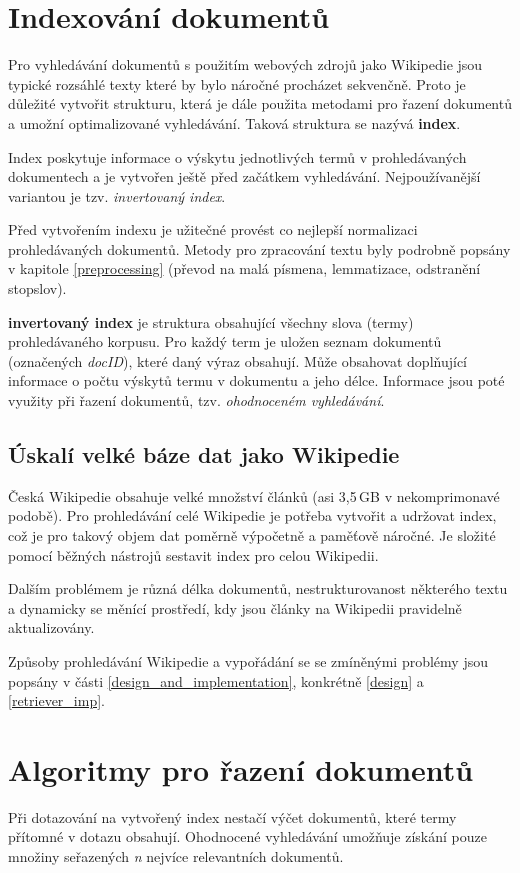 \section{Indexování dokumentů}
Pro vyhledávání dokumentů s použitím webových zdrojů jako Wikipedie jsou typické rozsáhlé texty které by bylo náročné procházet sekvenčně. Proto je důležité vytvořit strukturu, která je dále použita metodami pro řazení dokumentů a umožní optimalizované vyhledávání. Taková struktura se nazývá \textbf{index}.\par
Index poskytuje informace o výskytu jednotlivých termů v prohledávaných dokumentech a je vytvořen ještě před začátkem vyhledávání. Nejpoužívanější variantou je tzv. \emph{invertovaný index}.\par
Před vytvořením indexu je užitečné provést co nejlepší normalizaci prohledávaných dokumentů. Metody pro zpracování textu byly podrobně popsány v kapitole \ref{preprocessing} (převod na malá písmena, lemmatizace, odstranění stopslov).\par
\textbf{invertovaný index} je struktura obsahující všechny slova (termy) prohledávaného korpusu. Pro každý term je uložen seznam dokumentů (označených \emph{docID}), které daný výraz obsahují. Může obsahovat doplňující informace o počtu výskytů termu v dokumentu a jeho délce. Informace jsou poté využity při řazení dokumentů, tzv. \emph{ohodnoceném vyhledávání}.

\subsection{Úskalí velké báze dat jako Wikipedie}
Česká Wikipedie obsahuje velké množství článků (asi 3,5\,GB v nekomprimonavé podobě). Pro prohledávání celé Wikipedie je potřeba vytvořit a udržovat index, což je pro takový objem dat poměrně výpočetně a paměťově náročné. Je složité pomocí běžných nástrojů sestavit index pro celou Wikipedii.\par
Dalším problémem je různá délka dokumentů, nestrukturovanost některého textu a dynamicky se měnící prostředí, kdy jsou články na Wikipedii pravidelně aktualizovány.\par\enlargethispage{\baselineskip}
Způsoby prohledávání Wikipedie a vypořádání se se zmíněnými problémy jsou popsány v části \ref{design_and_implementation}, konkrétně \ref{design} a \ref{retriever_imp}.

\section{Algoritmy pro řazení dokumentů}
Při dotazování na vytvořený index nestačí výčet dokumentů, které termy přítomné v dotazu obsahují. Ohodnocené vyhledávání umožňuje získání pouze množiny seřazených \emph{n} nejvíce relevantních dokumentů.\par

